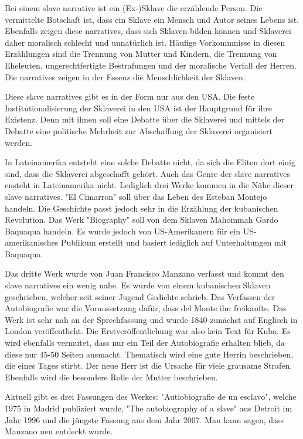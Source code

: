 \documentclass[10pt,a4paper,oneside,ngerman,numbers=noenddot]{scrartcl}
\begin{document}
Bei einem slave narrative ist ein (Ex-)Sklave die erzählende Person. Die vermittelte
Botschaft ist, dass ein Sklave ein Mensch und Autor seines Lebens ist. Ebenfalls
zeigen diese narratives, dass sich Sklaven bilden können und Sklaverei daher
moralisch schlecht und unnatürlich ist. Häufige Vorkommnisse in diesen Erzählungen
sind die Trennung von Mutter und Kindern, die Trennung von Eheleuten,
ungerechtfertigte Bestrafungen und der moralische Verfall der Herren. Die
narratives zeigen in der Essenz die Menschlichkeit der Sklaven.

Diese slave narratives gibt es in der Form nur aus den USA. Die feste
Institutionalisierung der Sklaverei in den USA ist der Hauptgrund für ihre Existenz.
Denn mit ihnen soll eine Debatte über die Sklaverei und mittels der Debatte eine
politische Mehrheit zur Abschaffung der Sklaverei organisiert werden.

In Lateinamerika entsteht eine solche Debatte nicht, da sich die Eliten dort
einig sind, dass die Sklaverei abgeschafft gehört. Auch das Genre der slave
narratives ensteht in Lateinamerika nicht. Lediglich drei Werke kommen in die
Nähe dieser slave narratives. "El Cimarron" soll über das Leben des Esteban Montejo
handeln. Die Geschichte passt jedoch sehr in die Erzählung der kubanischen
Revolution. Das Werk "Biography" soll von dem Sklaven Mahommah Gardo Baquaqua
handeln. Es wurde jedoch von US-Amerikanern für ein US-amerikanisches Publikum
erstellt und basiert lediglich auf Unterhaltungen mit Baquaqua.

Das dritte
Werk wurde von Juan Francisco Manzano verfasst und kommt den slave narratives
ein wenig nahe. Es wurde von einem kubanischen Sklaven geschrieben, welcher
seit seiner Jugend Gedichte schrieb. Das Verfassen der Autobiografie war die
Voraussetzung dafür, dass del Monte ihn freikaufte. Das Werk ist sehr nah an
der Sprechfassung und wurde 1840 zunächst auf Englisch in London veröffentlicht.
Die Erstveröffentlichung war also kein Text für Kuba. Es wird ebenfalls vermutet,
dass nur ein Teil der Autobiografie erhalten blieb, da diese nur 45-50 Seiten
ausmacht. Thematisch wird eine gute Herrin beschrieben, die eines Tages stirbt.
Der neue Herr ist die Ursache für viele grausame Strafen. Ebenfalls wird die
besondere Rolle der Mutter beschrieben.

Aktuell gibt es drei Fassungen des Werkes: "Autiobiografie de un esclavo", welche
1975 in Madrid publiziert wurde, "The autobiography of a slave" aus Detroit im Jahr
1996 und die jüngste Fassung aus dem Jahr 2007. Man kann sagen, dass Manzano neu
entdeckt wurde.
\end{document}
